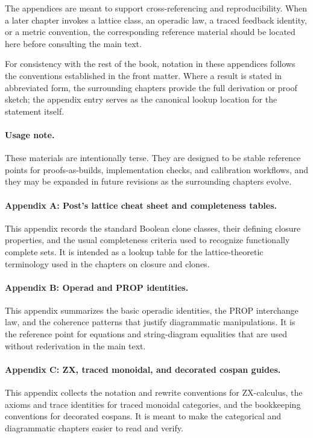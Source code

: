\documentclass[11pt]{article}
\begin{document}
The appendices are meant to support cross-referencing and reproducibility. When a later chapter invokes a lattice class, an operadic law, a traced feedback identity, or a metric convention, the corresponding reference material should be located here before consulting the main text.

For consistency with the rest of the book, notation in these appendices follows the conventions established in the front matter. Where a result is stated in abbreviated form, the surrounding chapters provide the full derivation or proof sketch; the appendix entry serves as the canonical lookup location for the statement itself.

\paragraph{Usage note.} These materials are intentionally terse. They are designed to be stable reference points for proofs-as-builds, implementation checks, and calibration workflows, and they may be expanded in future revisions as the surrounding chapters evolve.

\paragraph{Appendix A: Post's lattice cheat sheet and completeness tables.} This appendix records the standard Boolean clone classes, their defining closure properties, and the usual completeness criteria used to recognize functionally complete sets. It is intended as a lookup table for the lattice-theoretic terminology used in the chapters on closure and clones.

\paragraph{Appendix B: Operad and PROP identities.} This appendix summarizes the basic operadic identities, the PROP interchange law, and the coherence patterns that justify diagrammatic manipulations. It is the reference point for equations and string-diagram equalities that are used without rederivation in the main text.

\paragraph{Appendix C: ZX, traced monoidal, and decorated cospan guides.} This appendix collects the notation and rewrite conventions for ZX-calculus, the axioms and trace identities for traced monoidal categories, and the bookkeeping conventions for decorated cospans. It is meant to make the categorical and diagrammatic chapters easier to read and verify.
\end{document}
